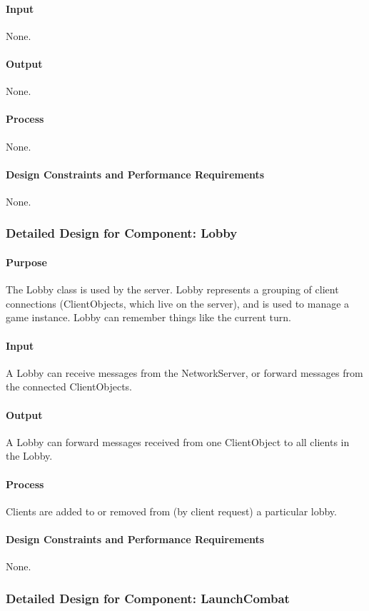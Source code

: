 \documentclass[12pt,a4paper,titlepage]{article}
\begin{document}
\paragraph{Input} None.
\paragraph{Output} None.
\paragraph{Process} None.
\paragraph{Design Constraints and Performance Requirements} None.
	
\subsubsection{Detailed Design for Component: Lobby }
\paragraph{Purpose} The Lobby class is used by the server. Lobby represents a grouping of client connections (ClientObjects, which live on the server), and is used to manage a game instance. Lobby can remember things like the current turn. 
\paragraph{Input} A Lobby can receive messages from the NetworkServer, or forward messages from the connected ClientObjects. 
\paragraph{Output} A Lobby can forward messages received from one ClientObject to all clients in the Lobby.
\paragraph{Process} Clients are added to or removed from (by client request) a particular lobby. 
\paragraph{Design Constraints and Performance Requirements} None.

\subsubsection{Detailed Design for Component: LaunchCombat}
\end{document}
